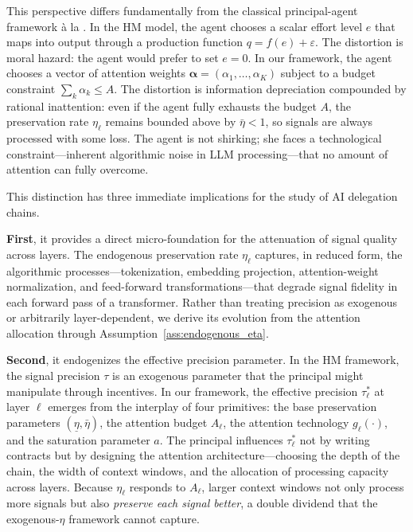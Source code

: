This perspective differs fundamentally from the classical principal-agent framework \`{a} la \citet{holmstrom1991multitask}. In the HM model, the agent chooses a scalar effort level $e$ that maps into output through a production function $q = f(e) + \varepsilon$. The distortion is moral hazard: the agent would prefer to set $e = 0$. In our framework, the agent chooses a vector of attention weights $\boldsymbol{\alpha} = (\alpha_1, \ldots, \alpha_K)$ subject to a budget constraint $\sum_k \alpha_k \leq A$. The distortion is information depreciation compounded by rational inattention: even if the agent fully exhausts the budget $A$, the preservation rate $\eta_\ell$ remains bounded above by $\bar{\eta} < 1$, so signals are always processed with some loss. The agent is not shirking; she faces a technological constraint---inherent algorithmic noise in LLM processing---that no amount of attention can fully overcome.

This distinction has three immediate implications for the study of AI delegation chains.

\textbf{First}, it provides a direct micro-foundation for the attenuation of signal quality across layers. The endogenous preservation rate $\eta_\ell$ captures, in reduced form, the algorithmic processes---tokenization, embedding projection, attention-weight normalization, and feed-forward transformations---that degrade signal fidelity in each forward pass of a transformer. Rather than treating precision as exogenous or arbitrarily layer-dependent, we derive its evolution from the attention allocation through Assumption~\ref{ass:endogenous_eta}.

\textbf{Second}, it endogenizes the effective precision parameter. In the HM framework, the signal precision $\tau$ is an exogenous parameter that the principal might manipulate through incentives. In our framework, the effective precision $\tau^{*}_\ell$ at layer $\ell$ emerges from the interplay of four primitives: the base preservation parameters $(\underline{\eta}, \bar{\eta})$, the attention budget $A_\ell$, the attention technology $g_\ell(\cdot)$, and the saturation parameter $a$. The principal influences $\tau^{*}_\ell$ not by writing contracts but by designing the attention architecture---choosing the depth of the chain, the width of context windows, and the allocation of processing capacity across layers. Because $\eta_\ell$ responds to $A_\ell$, larger context windows not only process more signals but also \emph{preserve each signal better}, a double dividend that the exogenous-$\eta$ framework cannot capture.

